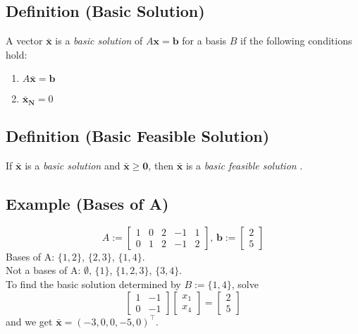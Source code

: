 \begin{defbox}
    \subsection{Definition (Basic Solution)}
    A vector $\mathbf{\bar{x}}$ is a \emph{basic solution} of $ A \mathbf{x}=\mathbf{b} $
    for a basis $ B $ if the following conditions hold:
    \begin{enumerate}[(1)]
        \item $A \mathbf{\bar{x}}=\mathbf{b}$
        \item $\mathbf{\bar{x}_N}=0$
    \end{enumerate}
\end{defbox}

\begin{defbox}
    \subsection{Definition (Basic Feasible Solution)}
    If $\mathbf{\bar{x}}$ is a \emph{basic solution} and $\mathbf{\bar{x}}\ge \mathbf{0}$,
    then $\mathbf{\bar{x}}$ is a \emph{basic feasible solution} .
\end{defbox}

\subsection{Example (Bases of A)}
\[A:=
\begin{bmatrix}
    1 & 0 & 2 & -1 & 1\\
    0 & 1 & 2 & -1 & 2
\end{bmatrix}
\text{, }
\mathbf{b}:=
\begin{bmatrix}
    2\\
    5
\end{bmatrix}
\]
Bases of A: $\{1,2\}$, $\{2,3\}$, $\{1,4\}$.\\
Not a bases of A: $\emptyset$, $\{1\}$, $\{1,2,3\}$, $\{3,4\}$.\\
To find the basic solution determined by $B:=\{1,4\}$, solve
\[
\begin{bmatrix}
    1 & -1\\
    0 & -1
\end{bmatrix}
\begin{bmatrix}
    x_1\\
    x_4
\end{bmatrix}
=
\begin{bmatrix}
    2\\
    5
\end{bmatrix}
\]
and we get $\mathbf{\bar{x}}=(-3,0,0,-5,0)^\top $.